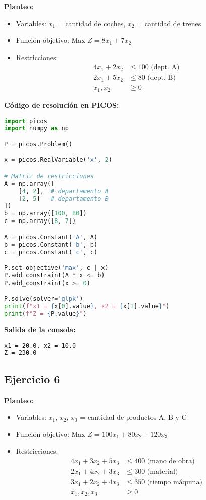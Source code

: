 \documentclass[12pt]{article}
\begin{document}
\begin{enumerate}
\textbf{Planteo:}
\begin{itemize}
\item Variables: $x_1$ = cantidad de coches, $x_2$ = cantidad de trenes
\item Función objetivo: Max $Z = 8x_1 + 7x_2$
\item Restricciones:
  \begin{align*}
  4x_1 + 2x_2 &\leq 100 \text{ (dept. A)} \\
  2x_1 + 5x_2 &\leq 80 \text{ (dept. B)} \\
  x_1, x_2 &\geq 0
  \end{align*}
\end{itemize}

\textbf{Código de resolución en PICOS:}
\begin{lstlisting}[language=Python]
import picos
import numpy as np

P = picos.Problem()

x = picos.RealVariable('x', 2)

# Matriz de restricciones
A = np.array([
    [4, 2],  # departamento A
    [2, 5]   # departamento B
])
b = np.array([100, 80])
c = np.array([8, 7])

A = picos.Constant('A', A)
b = picos.Constant('b', b)
c = picos.Constant('c', c)

P.set_objective('max', c | x)
P.add_constraint(A * x <= b)
P.add_constraint(x >= 0)

P.solve(solver='glpk')
print(f"x1 = {x[0].value}, x2 = {x[1].value}")
print(f"Z = {P.value}")
\end{lstlisting}

\textbf{Salida de la consola:}
\begin{lstlisting}[language=bash,backgroundcolor=\color{black},basicstyle=\color{white}\ttfamily,numbers=none]
x1 = 20.0, x2 = 10.0
Z = 230.0
\end{lstlisting}

\subsection*{Ejercicio 6}

\textbf{Planteo:}
\begin{itemize}
\item Variables: $x_1$, $x_2$, $x_3$ = cantidad de productos A, B y C
\item Función objetivo: Max $Z = 100x_1 + 80x_2 + 120x_3$
\item Restricciones:
  \begin{align*}
  4x_1 + 3x_2 + 5x_3 &\leq 400 \text{ (mano de obra)} \\
  2x_1 + 4x_2 + 3x_3 &\leq 300 \text{ (material)} \\
  3x_1 + 2x_2 + 4x_3 &\leq 350 \text{ (tiempo máquina)} \\
  x_1, x_2, x_3 &\geq 0
  \end{align*}
\end{itemize}


\end{enumerate}
\end{document}
